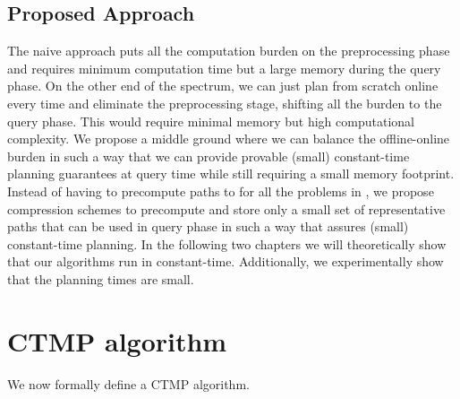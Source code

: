 \documentclass[a4paper]{report}
\begin{document}
\subsection{Proposed Approach}
The naive approach puts all the computation burden on the preprocessing phase and requires minimum computation time but a large memory during the query phase. On the other end of the spectrum, we can just plan from scratch online every time and eliminate the preprocessing stage, shifting all the burden to the query phase. This would require minimal memory but high computational complexity. We propose a middle ground where we can balance the offline-online burden in such a way that we can provide provable (small) constant-time planning guarantees at query time while still requiring a small memory footprint. Instead of having to precompute paths to for all the problems in \pset, we propose compression schemes to precompute and store only a small set of representative paths that can be used in query phase in such a way that assures (small) constant-time planning. In the following two chapters we will theoretically show that our algorithms run in constant-time. Additionally, we experimentally show that the planning times are small.

\section{CTMP algorithm}
\label{subsec:ctmp_alg}

We now formally define a CTMP algorithm.
%

\vspace{2mm}
\end{document}
